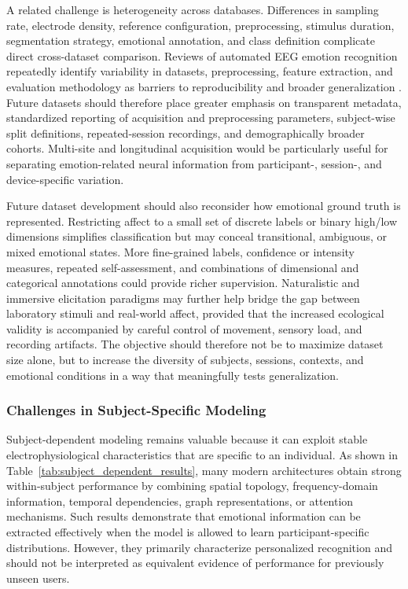 \documentclass{WileyMSP-template}
\begin{document}
A related challenge is heterogeneity across databases. Differences in sampling rate, electrode density, reference configuration, preprocessing, stimulus duration, segmentation strategy, emotional annotation, and class definition complicate direct cross-dataset comparison. Reviews of automated EEG emotion recognition repeatedly identify variability in datasets, preprocessing, feature extraction, and evaluation methodology as barriers to reproducibility and broader generalization \cite{vempati2023automatedeegreview}. Future datasets should therefore place greater emphasis on transparent metadata, standardized reporting of acquisition and preprocessing parameters, subject-wise split definitions, repeated-session recordings, and demographically broader cohorts. Multi-site and longitudinal acquisition would be particularly useful for separating emotion-related neural information from participant-, session-, and device-specific variation.

Future dataset development should also reconsider how emotional ground truth is represented. Restricting affect to a small set of discrete labels or binary high/low dimensions simplifies classification but may conceal transitional, ambiguous, or mixed emotional states. More fine-grained labels, confidence or intensity measures, repeated self-assessment, and combinations of dimensional and categorical annotations could provide richer supervision. Naturalistic and immersive elicitation paradigms may further help bridge the gap between laboratory stimuli and real-world affect, provided that the increased ecological validity is accompanied by careful control of movement, sensory load, and recording artifacts. The objective should therefore not be to maximize dataset size alone, but to increase the diversity of subjects, sessions, contexts, and emotional conditions in a way that meaningfully tests generalization.

\subsubsection{Challenges in Subject-Specific Modeling}
\label{subsubsec:subject_specific_challenges}

Subject-dependent modeling remains valuable because it can exploit stable electrophysiological characteristics that are specific to an individual. As shown in Table~\ref{tab:subject_dependent_results}, many modern architectures obtain strong within-subject performance by combining spatial topology, frequency-domain information, temporal dependencies, graph representations, or attention mechanisms. Such results demonstrate that emotional information can be extracted effectively when the model is allowed to learn participant-specific distributions. However, they primarily characterize personalized recognition and should not be interpreted as equivalent evidence of performance for previously unseen users.
\end{document}
